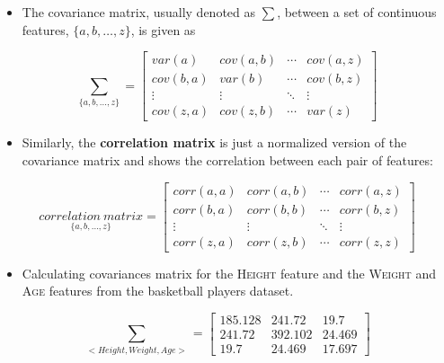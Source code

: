\documentclass[xcolor={table}]{beamer}
\newcommand{\indexkeyword}[1]{\alert{\textbf{#1}\index{#1}}}
\newcommand{\featN}[1]{\textsc{#1}}
\begin{document}
 \begin{frame} 
  \begin{itemize}
		\item The covariance matrix, usually denoted as $\sum$, between a set of continuous features, $\{a, b, \ldots, z\}$, is given as
		\end{itemize}
\begin{equation}
\sum_{\{a,b,\ldots,z\}}=
\begin{bmatrix}
var(a) & cov(a,b) & \cdots &cov(a,z) \\
cov(b,a) & var(b) & \cdots & cov(b,z) \\
\vdots & \vdots & \ddots & \vdots \\
cov(z,a) & cov(z,b) & \cdots & var(z) 
\end{bmatrix}
\label{eq:covMatrix}
\end{equation}
\end{frame} 

 \begin{frame} 
  \begin{itemize}
\item Similarly, the \indexkeyword{correlation matrix} is just a normalized version of the covariance matrix and shows the correlation between each pair of features:
\end{itemize}
\begin{equation}
\underset{\{a,b,\ldots,z\}}{correlation~matrix} = 
\begin{bmatrix}
corr(a, a) & corr(a,b) & \cdots &corr(a,z) \\
corr(b,a) & corr(b, b) & \cdots & corr(b,z) \\
\vdots & \vdots & \ddots & \vdots \\
corr(z,a) & corr(z,b) & \cdots & corr(z, z) 
\end{bmatrix}
\label{eq:corrMatrix}
\end{equation}
\end{frame} 



 \begin{frame} 
\begin{itemize}
\item Calculating covariances matrix for the \featN{Height} feature and the \featN{Weight} and \featN{Age} features from the basketball players dataset. 
\end{itemize}
\begin{equation*}
\sum_{<Height, Weight, Age>}=
\begin{bmatrix}
185.128	& 241.72 & 19.7 \\
241.72	& 392.102 & 24.469 \\
19.7	& 24.469 & 17.697 
\end{bmatrix}
\label{eq:covmatrixexample}
\end{equation*}
\end{frame} 
\end{document}
